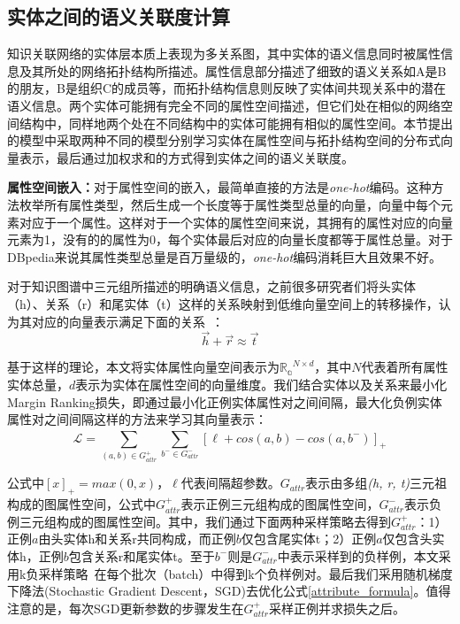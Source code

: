 \subsection{实体之间的语义关联度计算}
\label{subsec4-3-3}
知识关联网络的实体层本质上表现为多关系图，其中实体的语义信息同时被属性信息及其所处的网络拓扑结构所描述。属性信息部分描述了细致的语义关系如A是B的朋友，B是组织C的成员等，而拓扑结构信息则反映了实体间共现关系中的潜在语义信息。两个实体可能拥有完全不同的属性空间描述，但它们处在相似的网络空间结构中，同样地两个处在不同结构中的实体可能拥有相似的属性空间。本节提出的模型中采取两种不同的模型分别学习实体在属性空间与拓扑结构空间的分布式向量表示，最后通过加权求和的方式得到实体之间的语义关联度。

\textbf{属性空间嵌入：}对于属性空间的嵌入，最简单直接的方法是\emph{one-hot}编码。这种方法枚举所有属性类型，然后生成一个长度等于属性类型总量的向量，向量中每个元素对应于一个属性。这样对于一个实体的属性空间来说，其拥有的属性对应的向量元素为1，没有的的属性为0，每个实体最后对应的向量长度都等于属性总量。对于DBpedia来说其属性类型总量是百万量级的，\emph{one-hot}编码消耗巨大且效果不好。

对于知识图谱中三元组所描述的明确语义信息，之前很多研究者们将头实体（h）、关系（r）和尾实体（t）这样的关系映射到低维向量空间上的转移操作，认为其对应的向量表示满足下面的关系~\cite{nips/BordesUGWY13, aaai/WuFCABW18}：
\begin{equation}
    \label{hrt}
    \vec h + \vec r \approx \vec t
\end{equation}

\noindent 基于这样的理论，本文将实体属性向量空间表示为$\mathbb{R_a} ^ {N \times d}$，其中$N$代表着所有属性实体总量，$d$表示为实体在属性空间的向量维度。我们结合实体以及关系来最小化Margin Ranking损失，即通过最小化正例实体属性对之间间隔，最大化负例实体属性对之间间隔这样的方法来学习其向量表示：
\begin{equation}
    \label{attribute_formula}
    \mathcal{L} = \sum_{(a,b) \in G_{attr}^+}^{ } \sum_{b^- \in G_{attr}^-}^{ }[\ell + cos(a,b)-cos(a,b^-)]_+
\end{equation}

\noindent 公式中$[x]_+=max(0, x)$，$\ell$代表间隔超参数。$G_{attr}$表示由多组\emph{(h, r, t)}三元祖构成的图属性空间，公式中$G_{attr}^+$表示正例三元组构成的图属性空间，$G_{attr}^-$表示负例三元组构成的图属性空间。其中，我们通过下面两种采样策略去得到$G_{attr}^+$：1）正例$a$由头实体h和关系r共同构成，而正例$b$仅包含尾实体t；2）正例$a$仅包含头实体h，正例$b$包含关系r和尾实体t。至于$b^-$则是$G_{attr}^-$中表示采样到的负样例，本文采用k负采样策略~\cite{corr/Mikolov13}在每个批次（batch）中得到k个负样例对。最后我们采用随机梯度下降法(Stochastic Gradient Descent，SGD)去优化公式\ref{attribute_formula}。值得注意的是，每次SGD更新参数的步骤发生在$G_{attr}^+$采样正例并求损失之后。

